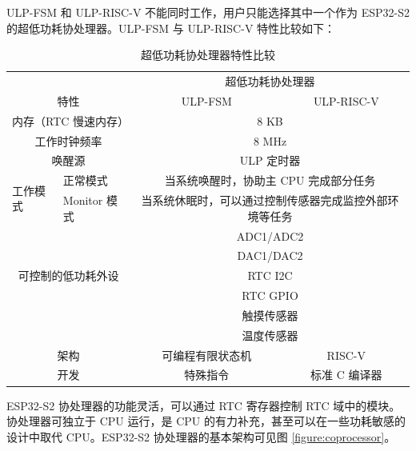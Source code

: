 \documentclass[main\_\_CN.tex]{subfiles}
\begin{document}
ULP-FSM 和 ULP-RISC-V 不能同时工作，用户只能选择其中一个作为 ESP32-S2 的超低功耗协处理器。ULP-FSM 与 ULP-RISC-V 特性比较如下：


\begin{table}[!ht]
    \centering
    \begin{tabular}[c]{| p{2.5cm} | p{3cm} | c | c |}
    \hline
    \multicolumn{2}{|c}{} & \multicolumn{2}{|c|}{超低功耗协处理器}         \\
    \cline{3-4}
    \multicolumn{2}{|c|}{\multirow{-2}{*}{特性}} & ULP-FSM & ULP-RISC-V  \\
    \hline
    \multicolumn{2}{|c}{内存（RTC 慢速内存）}  & \multicolumn{2}{|c|}{8 KB}  \\
    \hline
    \multicolumn{2}{|c}{工作时钟频率} & \multicolumn{2}{|c|}{8 MHz} \\
    \hline
    \multicolumn{2}{|c}{唤醒源} & \multicolumn{2}{|c|}{ULP 定时器} \\
    \hline
    \multirow{2}{*}{工作模式} & 正常模式 & \multicolumn{2}{c|}{当系统唤醒时，协助主 CPU 完成部分任务} \\
    \cline{2-4}
    & Monitor 模式 & \multicolumn{2}{c|}{当系统休眠时，可以通过控制传感器完成监控外部环境等任务} \\
    \hline
    \multicolumn{2}{|c}{\multirow{5}{*}{可控制的低功耗外设}} & \multicolumn{2}{|c|}{ADC1/ADC2}    \\
    \cline{3-4}
     \multicolumn{2}{|c}{} & \multicolumn{2}{|c|}{DAC1/DAC2}  \\
    \cline{3-4}
    \multicolumn{2}{|c}{} & \multicolumn{2}{|c|}{RTC I2C}  \\
    \cline{3-4}
    \multicolumn{2}{|c}{} & \multicolumn{2}{|c|}{RTC GPIO}  \\
     \cline{3-4}
    \multicolumn{2}{|c}{} & \multicolumn{2}{|c|}{触摸传感器}  \\
     \cline{3-4}
    \multicolumn{2}{|c}{} & \multicolumn{2}{|c|}{温度传感器}   \\
    \hline
    \multicolumn{2}{|c|}{架构} & 可编程有限状态机 & RISC-V\\
    \hline
    \multicolumn{2}{|c|}{开发} & 特殊指令 & 标准 C 编译器 \\
    \hline
    \end{tabular}
    \caption{超低功耗协处理器特性比较}
\end{table}

ESP32-S2 协处理器的功能灵活，可以通过 RTC 寄存器控制 RTC 域中的模块。协处理器可独立于 CPU 运行，是 CPU 的有力补充，甚至可以在一些功耗敏感的设计中取代 CPU。ESP32-S2 协处理器的基本架构可见图 \ref{figure:coprocessor}。
\end{document}
